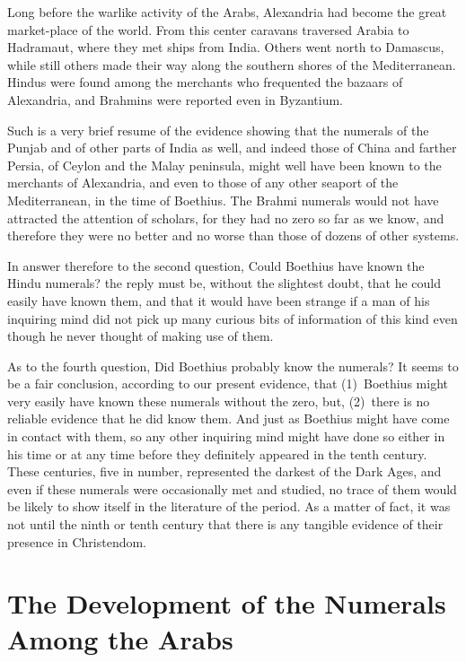 \documentclass[11pt,a4paper]{article}
\begin{document}
Long before the warlike activity of the Arabs, Alexandria had become the great market-place of the world. From this center caravans traversed Arabia to Hadramaut, where they met ships from India. Others went north to Damascus, while still others made their way along the southern shores of the Mediterranean. Hindus were found among the merchants who frequented the bazaars of Alexandria, and Brahmins were reported even in Byzantium.

Such is a very brief resume of the evidence showing that the numerals of the Punjab and of other parts of India as well, and indeed those of China and farther Persia, of Ceylon and the Malay peninsula, might well have been known to the merchants of Alexandria, and even to those of any other seaport of the Mediterranean, in the time of Boethius. The Brahmi numerals would not have attracted the attention of scholars, for they had no zero so far as we know, and therefore they were no better and no worse than those of dozens of other systems.

In answer therefore to the second question, Could Boethius have known the Hindu numerals? the reply must be, without the slightest doubt, that he could easily have known them, and that it would have been strange if a man of his inquiring mind did not pick up many curious bits of information of this kind even though he never thought of making use of them.

As to the fourth question, Did Boethius probably know the numerals? It seems to be a fair conclusion, according to our present evidence, that (1)~Boethius might very easily have known these numerals without the zero, but, (2)~there is no reliable evidence that he did know them. And just as Boethius might have come in contact with them, so any other inquiring mind might have done so either in his time or at any time before they definitely appeared in the tenth century. These centuries, five in number, represented the darkest of the Dark Ages, and even if these numerals were occasionally met and studied, no trace of them would be likely to show itself in the literature of the period. As a matter of fact, it was not until the ninth or tenth century that there is any tangible evidence of their presence in Christendom.


\section{The Development of the Numerals Among the Arabs}
\end{document}
